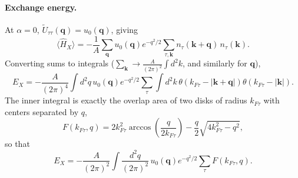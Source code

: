 \paragraph{Exchange energy.} At $\alpha=0$, $\tilde U_{\tau\tau}(\mathbf q) = u_0(\mathbf q)$, giving
\begin{equation}
    \langle \hat{H}_X \rangle = -\frac{1}{A} \sum_{\mathbf{q}} u_0(\mathbf{q}) e^{-q^2/2} \sum_{\tau, \mathbf{k}} n_\tau(\mathbf{k+q}) \, n_\tau(\mathbf{k}).
    \label{eq:exchange_energy_start}
\end{equation}
Converting sums to integrals ($\sum_{\mathbf{k}} \to \frac{A}{{(2\pi)}^2}\int d^2k$, and similarly for $\mathbf q$),
\begin{equation}
    E_X = -\frac{A}{{(2\pi)}^4} \int d^2q\, u_0(\mathbf{q}) e^{-q^2/2} \sum_{\tau} \int d^2k\, \theta(k_{F\tau}-|\mathbf{k+q}|)\theta(k_{F\tau}-|\mathbf{k}|).
    \label{eq:exchange_energy_integral}
\end{equation}
The inner integral is exactly the overlap area of two disks of radius $k_{F\tau}$ with centers separated by $q$,
\begin{equation}
    F(k_{F\tau}, q) = 2 k_{F\tau}^2 \arccos\!\left(\frac{q}{2 k_{F\tau}}\right) - \frac{q}{2} \sqrt{4 k_{F\tau}^2 - q^2},
    \label{eq:overlap_area}
\end{equation}
so that
\begin{equation}
    E_X = -\frac{A}{{(2\pi)}^2} \int \frac{d^2q}{{(2\pi)}^2}\, u_0(\mathbf{q}) e^{-q^2/2} \sum_\tau F(k_{F\tau}, q).
    \label{eq:exchange_energy_grouped}
\end{equation}

